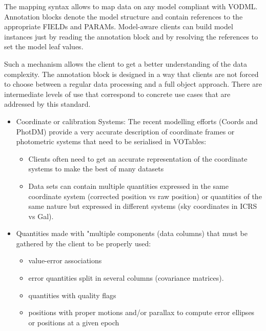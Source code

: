 

The mapping syntax allows to map data on any model compliant with VODML. 
Annotation blocks denote the model structure and contain references to the appropriate
FIELDs and PARAMs. Model-aware clients can build model instances just by reading the annotation
block and by resolving the references to set the model leaf values. 

Such a mechanism allows the client to get a better understanding of the data complexity.
The annotation block is designed in a way that clients are not forced to choose between a regular data processing and a full object approach.
There are intermediate levels of use that correspond to concrete use cases that are addressed by this standard.



\begin{itemize}
  \item Coordinate or calibration Systems: The recent modelling efforts (Coords and PhotDM) provide a very accurate description of coordinate frames or photometric systems that need to be serialised in VOTables:
  \begin{itemize}
    \item Clients often need to get an accurate representation of the coordinate systems to make the best of many datasets  
    \item Data sets can contain multiple quantities expressed in the same coordinate system (corrected position vs raw position) or 
             quantities of the same nature but expressed in different systems (sky coordinates in ICRS vs Gal). %
  \end{itemize} 
  
  \item Quantities made with "multiple components (data columns) that must be gathered by the client to be properly used:
  \begin{itemize}
    \item value-error associations
    \item error quantities split in several columns (covariance matrices). 
    \item quantities with quality flags
    \item positions with proper motions and/or parallax to compute error ellipses or positions at a given epoch
  \end{itemize} 


\end{itemize}
